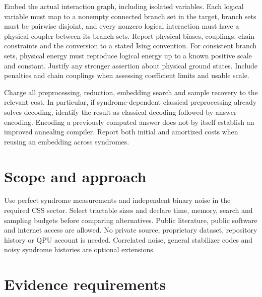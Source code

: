 \documentclass[11pt,letterpaper]{article}
\begin{document}
Embed the actual interaction graph, including isolated variables. Each logical variable must map to a nonempty connected branch set in the target, branch sets must be pairwise disjoint, and every nonzero logical interaction must have a physical coupler between its branch sets. Report physical biases, couplings, chain constraints and the conversion to a stated Ising convention. For consistent branch sets, physical energy must reproduce logical energy up to a known positive scale and constant. Justify any stronger assertion about physical ground states. Include penalties and chain couplings when assessing coefficient limits and usable scale.\par

Charge all preprocessing, reduction, embedding search and sample recovery to the relevant cost. In particular, if syndrome-dependent classical preprocessing already solves decoding, identify the result as classical decoding followed by answer encoding. Encoding a previously computed answer does not by itself establish an improved annealing compiler. Report both initial and amortized costs when reusing an embedding across syndromes.\par

\section{Scope and approach}

Use perfect syndrome measurements and independent binary noise in the required CSS sector. Select tractable sizes and declare time, memory, search and sampling budgets before comparing alternatives. Public literature, public software and internet access are allowed. No private source, proprietary dataset, repository history or QPU account is needed. Correlated noise, general stabilizer codes and noisy syndrome histories are optional extensions.\par

\section{Evidence requirements}
\end{document}
